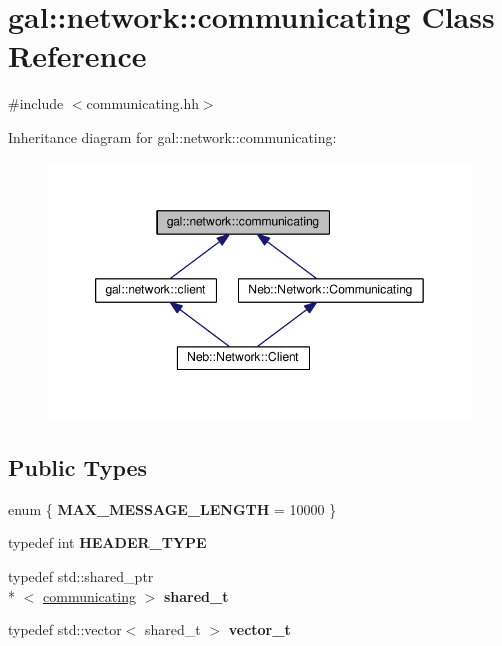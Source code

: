 \hypertarget{classgal_1_1network_1_1communicating}{\section{gal\-:\-:network\-:\-:communicating Class Reference}
\label{classgal_1_1network_1_1communicating}
}


{\ttfamily \#include $<$communicating.\-hh$>$}



Inheritance diagram for gal\-:\-:network\-:\-:communicating\-:
\nopagebreak
\begin{figure}[H]
\begin{center}
\leavevmode
\includegraphics[width=349pt]{classgal_1_1network_1_1communicating__inherit__graph}
\end{center}
\end{figure}
\subsection*{Public Types}
\begin{DoxyCompactItemize}
\item 
enum \{ {\bfseries M\-A\-X\-\_\-\-M\-E\-S\-S\-A\-G\-E\-\_\-\-L\-E\-N\-G\-T\-H} = 10000
 \}
\item 
\hypertarget{classgal_1_1network_1_1communicating_aef6c11aca9b227ec65e289b5f194cd83}{typedef int {\bfseries H\-E\-A\-D\-E\-R\-\_\-\-T\-Y\-P\-E}}\label{classgal_1_1network_1_1communicating_aef6c11aca9b227ec65e289b5f194cd83}

\item 
\hypertarget{classgal_1_1network_1_1communicating_a20c6f2dc53a296b6b34a82d5dc8f894a}{typedef std\-::shared\-\_\-ptr\\*
$<$ \hyperlink{classgal_1_1network_1_1communicating}{communicating} $>$ {\bfseries shared\-\_\-t}}\label{classgal_1_1network_1_1communicating_a20c6f2dc53a296b6b34a82d5dc8f894a}

\item 
\hypertarget{classgal_1_1network_1_1communicating_acde720b70acbd7aecc86d2ebd4d91113}{typedef std\-::vector$<$ shared\-\_\-t $>$ {\bfseries vector\-\_\-t}}\label{classgal_1_1network_1_1communicating_acde720b70acbd7aecc86d2ebd4d91113}

\end{DoxyCompactItemize}
